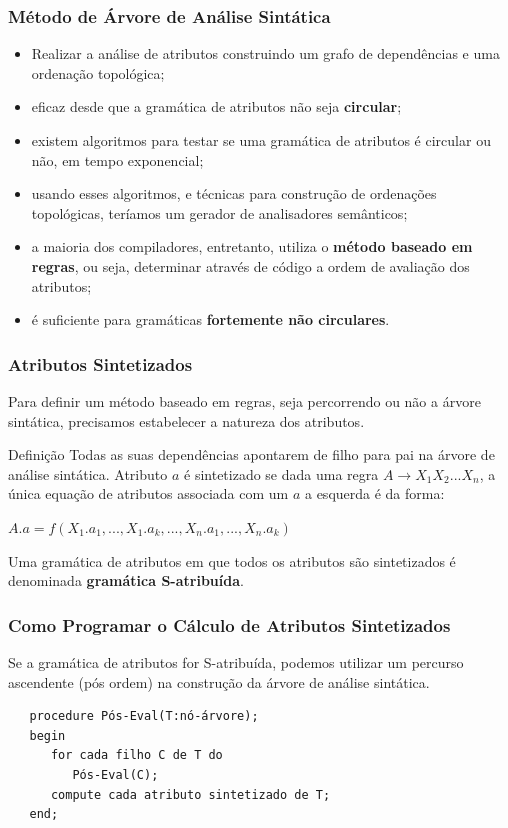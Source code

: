 \documentclass[table]{beamer}
\begin{document}
\begin{frame}
   \frametitle{Método de Árvore de Análise Sintática}
   \begin{itemize}
      \item Realizar a análise de atributos construindo um grafo de dependências e uma ordenação topológica;
      \item eficaz desde que a gramática de atributos não seja \textbf{circular};
      \item existem algoritmos para testar se uma gramática de atributos é circular ou não, em tempo exponencial;
      \item usando esses algoritmos, e técnicas para construção de ordenações topológicas, teríamos um gerador de analisadores semânticos;
      \item a maioria dos compiladores, entretanto, utiliza o \textbf{método baseado em regras}, ou seja, determinar através de código a ordem de avaliação dos atributos;
      \item é suficiente para gramáticas \textbf{fortemente não circulares}.
   \end{itemize}
\end{frame}

\begin{frame}
   \frametitle{Atributos Sintetizados}
   Para definir um método baseado em regras, seja percorrendo ou não a árvore sintática, precisamos estabelecer a natureza dos atributos. 
   \begin{block}{Definição}
   Todas as suas dependências apontarem de filho para pai na árvore de análise sintática. Atributo $a$ é sintetizado se dada uma regra $A\to X_{1}X_{2}...X_{n}$, a única equação de atributos associada com um $a$ a esquerda é da forma: \\
   \begin{center}
   $A.a = f(X_{1}.a_{1},...,X_{1}.a_{k},..., X_{n}.a_{1}, ..., X_{n}.a_{k})$ \\
   \end{center}
   Uma gramática de atributos em que todos os atributos são sintetizados é denominada \textbf{gramática S-atribuída}.
   \end{block}
\end{frame}

\begin{frame}[fragile]
   \frametitle{Como Programar o Cálculo de Atributos Sintetizados}
   Se a gramática de atributos for S-atribuída, podemos utilizar um percurso ascendente (pós ordem) na construção da árvore de análise sintática. 
   \begin{verbatim}
   procedure Pós-Eval(T:nó-árvore);
   begin
      for cada filho C de T do
         Pós-Eval(C); 
      compute cada atributo sintetizado de T;
   end;
   \end{verbatim}
\end{frame}
\end{document}
